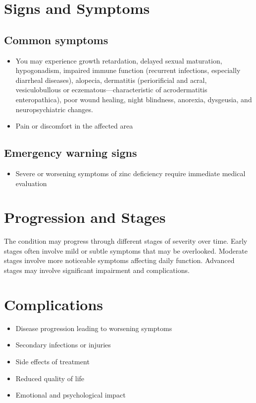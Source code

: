 \section{Signs and Symptoms}
\subsection{Common symptoms}
\begin{itemize}[noitemsep]
  \item You may experience growth retardation, delayed sexual maturation, hypogonadism, impaired immune function (recurrent infections, especially diarrheal diseases), alopecia, dermatitis (periorificial and acral, vesiculobullous or eczematous---characteristic of acrodermatitis enteropathica), poor wound healing, night blindness, anorexia, dysgeusia, and neuropsychiatric changes.
  \item Pain or discomfort in the affected area
  \end{itemize}
\subsection{Emergency warning signs}
\begin{itemize}[noitemsep]
  \item Severe or worsening symptoms of zinc deficiency require immediate medical evaluation
\end{itemize}
\section{Progression and Stages}
The condition may progress through different stages of severity over time. Early stages often involve mild or subtle symptoms that may be overlooked. Moderate stages involve more noticeable symptoms affecting daily function. Advanced stages may involve significant impairment and complications.
\section{Complications}
\begin{itemize}[noitemsep]
  \item Disease progression leading to worsening symptoms
  \item Secondary infections or injuries
  \item Side effects of treatment
  \item Reduced quality of life
  \item Emotional and psychological impact
\end{itemize}
